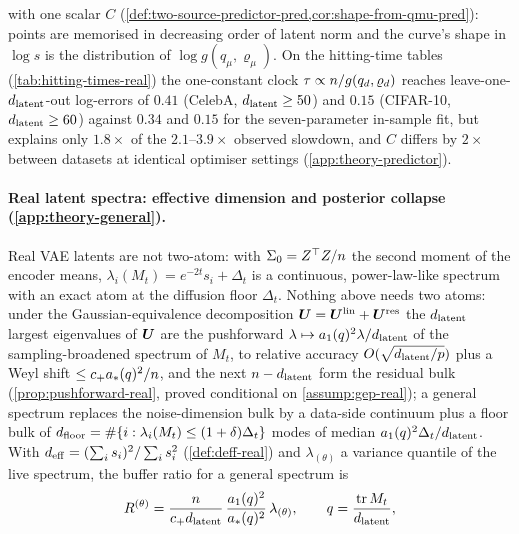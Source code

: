 with one scalar $C$ (\cref{def:two-source-predictor-pred,cor:shape-from-qmu-pred}): points are memorised in decreasing order of latent norm and the curve's shape in $\log s$ is the distribution of $\log g(q_\mu,\varrho_\mu)$. On the hitting-time tables (\cref{tab:hitting-times-real}) the one-constant clock $\tau\propto n/g(q_d,\varrho_d)$ reaches leave-one-$d_{\mathrm{latent}}$-out log-errors of $0.41$ (CelebA, $d_{\mathrm{latent}}\ge50$) and $0.15$ (CIFAR-10, $d_{\mathrm{latent}}\ge60$) against $0.34$ and $0.15$ for the seven-parameter in-sample fit, but explains only $1.8\times$ of the $2.1$--$3.9\times$ observed slowdown, and $C$ differs by $2\times$ between datasets at identical optimiser settings (\cref{app:theory-predictor}).

\paragraph{Real latent spectra: effective dimension and posterior collapse (\cref{app:theory-general}).}\label{sec:theory-real}
Real VAE latents are not two-atom: with $\Sigma_0=Z^{\top}Z/n$ the second moment of the encoder means, $\lambda_i(M_t)=e^{-2t}s_i+\Delta_t$ is a continuous, power-law-like spectrum with an exact atom at the diffusion floor $\Delta_t$. Nothing above needs two atoms: under the Gaussian-equivalence decomposition $\bm{U}=\bm{U}^{\rm lin}+\bm{U}^{\rm res}$ the $d_{\mathrm{latent}}$ largest eigenvalues of $\bm{U}$ are the pushforward $\lambda\mapsto a_1(q)^2\lambda/d_{\mathrm{latent}}$ of the sampling-broadened spectrum of $M_t$, to relative accuracy $O(\sqrt{d_{\mathrm{latent}}/p})$ plus a Weyl shift $\le c_+a_*(q)^2/n$, and the next $n-d_{\mathrm{latent}}$ form the residual bulk (\cref{prop:pushforward-real}, proved conditional on \cref{assump:gep-real}); a general spectrum replaces the noise-dimension bulk by a data-side continuum plus a floor bulk of $d_{\rm floor}=\#\{i:\lambda_i(M_t)\le(1+\delta)\Delta_t\}$ modes of median $a_1(q)^2\Delta_t/d_{\mathrm{latent}}$. With $d_{\rm eff}=(\sum_is_i)^2/\sum_is_i^2$ (\cref{def:deff-real}) and $\lambda_{(\theta)}$ a variance quantile of the live spectrum, the buffer ratio for a general spectrum is
\begin{equation}\label{eq:ratio-real-main}
R^{(\theta)}=\frac{n}{c_+d_{\mathrm{latent}}}\,\frac{a_1(q)^2}{a_*(q)^2}\,\lambda_{(\theta)},\qquad q=\frac{\operatorname{tr}M_t}{d_{\mathrm{latent}}},
\end{equation}

